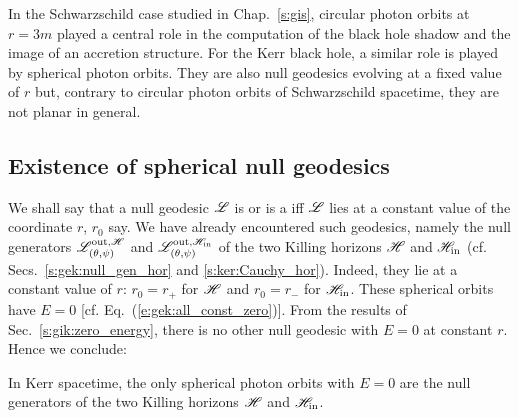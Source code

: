 In the Schwarzschild case studied in Chap.~\ref{s:gis}, circular photon
orbits at $r=3m$ played a central role in the computation of
the black hole shadow and the image of an accretion structure.
For the Kerr black hole, a similar role is played by spherical photon
orbits. They are also null geodesics evolving at a fixed value of $r$ but, contrary
to circular photon orbits of Schwarzschild spacetime, they are not planar
in general.


\subsection{Existence of spherical null geodesics} \label{s:gik:spher_existence}

We shall say that a null geodesic $\mathscr{L}$ is  or
is a  iff $\mathscr{L}$ lies at a constant value of the coordinate $r$, $r_0$ say.
We have already encountered such geodesics, namely the null generators
$\mathscr{L}^{{\rm out},\mathscr{H}}_{(\theta,\psi)}$ and $\mathscr{L}^{{\rm out},\mathscr{H}_{\rm in}}_{(\theta,\psi)}$
of the two Killing horizons
$\mathscr{H}$ and $\mathscr{H}_{\rm in}$ (cf. Secs.~\ref{s:gek:null_gen_hor} and \ref{s:ker:Cauchy_hor}).
Indeed, they lie at a constant value of $r$: $r_0 = r_+$ for
$\mathscr{H}$ and $r_0 = r_-$ for $\mathscr{H}_{\rm in}$.  These spherical orbits have $E=0$
[cf. Eq.~(\ref{e:gek:all_const_zero})].
From the results of Sec.~\ref{s:gik:zero_energy}, there is no other null geodesic with $E=0$ at constant $r$.
Hence we conclude:
\begin{prop}
In Kerr spacetime, the only spherical photon orbits with $E=0$ are the null generators of the two Killing horizons $\mathscr{H}$ and $\mathscr{H}_{\rm in}$.
\end{prop}

